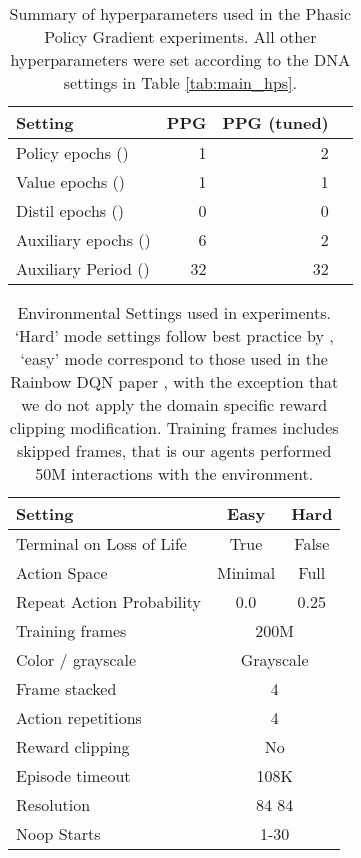 \documentclass{article}
\begin{document}
\begin{table}[h]
    \centering
    
    \begin{tabular}{l r r r }
    \toprule
        Setting & PPG & PPG (tuned) \\
    \midrule
        Policy epochs ()           & 1 & 2 \\
        Value epochs ()              & 1 & 1 \\
        Distil epochs ()             & 0 & 0 \\
        Auxiliary epochs () & 6 & 2 \\
        Auxiliary Period ()        & 32 & 32 \\

    \bottomrule
    \end{tabular}
        
    \caption{Summary of hyperparameters used in the Phasic Policy Gradient experiments. All other hyperparameters were set according to the DNA settings in Table \ref{tab:main_hps}.}
    \label{tab:ppg_hps}
\end{table}

\begin{table}[h]
    \centering
    \begin{tabular}{l c c}
    \toprule
    Setting & Easy & Hard \\
    \midrule
    Terminal on Loss of Life    & True & False \\
    Action Space                & Minimal & Full \\
    Repeat Action Probability   & 0.0 & 0.25  \\
    \midrule
    Training frames             & \multicolumn{2}{c}{200M} \\
    Color / grayscale           & \multicolumn{2}{c}{Grayscale} \\
    Frame stacked               & \multicolumn{2}{c}{4} \\
    Action repetitions          & \multicolumn{2}{c}{4} \\
    Reward clipping             & \multicolumn{2}{c}{No} \\
    Episode timeout             & \multicolumn{2}{c}{108K} \\
    Resolution                  & \multicolumn{2}{c}{84  84} \\
    Noop Starts                 & \multicolumn{2}{c}{1-30} \\
    \bottomrule
    \end{tabular}
    \caption{Environmental Settings used in experiments. `Hard' mode settings follow best practice by \cite{machado2018revisiting}, `easy' mode correspond to those used in the Rainbow DQN paper \cite{hessel2018rainbow}, with the exception that we do not apply the domain specific reward clipping modification. Training  frames includes skipped frames, that is our agents performed 50M interactions with the environment.}
    \label{tab:env_settings}
\end{table}
\end{document}
